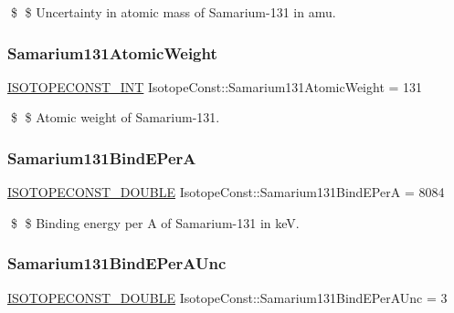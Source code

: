 \$ \$ Uncertainty in atomic mass of Samarium-\/131 in amu. \mbox{\label{group___isotope_const-_samarium-_sm131_ga9019eadc3ca02704e42c0a1b1f5d15e1}} 
\subsubsection{\texorpdfstring{Samarium131\+Atomic\+Weight}{Samarium131AtomicWeight}}
{\footnotesize\ttfamily \mbox{\hyperlink{group___isotope_const-_macros_ga5f18360b3e99483a35c32d789e62621c}{I\+S\+O\+T\+O\+P\+E\+C\+O\+N\+S\+T\+\_\+\+I\+NT}} Isotope\+Const\+::\+Samarium131\+Atomic\+Weight = 131}

\$ \$ Atomic weight of Samarium-\/131. \mbox{\label{group___isotope_const-_samarium-_sm131_gab891cfe9ed0e562a04291e3f3e443ae3}} 
\subsubsection{\texorpdfstring{Samarium131\+Bind\+E\+PerA}{Samarium131BindEPerA}}
{\footnotesize\ttfamily \mbox{\hyperlink{group___isotope_const-_macros_ga8f45a7272ce02c0b4c65c44636ed719a}{I\+S\+O\+T\+O\+P\+E\+C\+O\+N\+S\+T\+\_\+\+D\+O\+U\+B\+LE}} Isotope\+Const\+::\+Samarium131\+Bind\+E\+PerA = 8084}

\$ \$ Binding energy per A of Samarium-\/131 in keV. \mbox{\label{group___isotope_const-_samarium-_sm131_ga67a587b75a3dadbef377f4fd43627b92}} 
\subsubsection{\texorpdfstring{Samarium131\+Bind\+E\+Per\+A\+Unc}{Samarium131BindEPerAUnc}}
{\footnotesize\ttfamily \mbox{\hyperlink{group___isotope_const-_macros_ga8f45a7272ce02c0b4c65c44636ed719a}{I\+S\+O\+T\+O\+P\+E\+C\+O\+N\+S\+T\+\_\+\+D\+O\+U\+B\+LE}} Isotope\+Const\+::\+Samarium131\+Bind\+E\+Per\+A\+Unc = 3}

